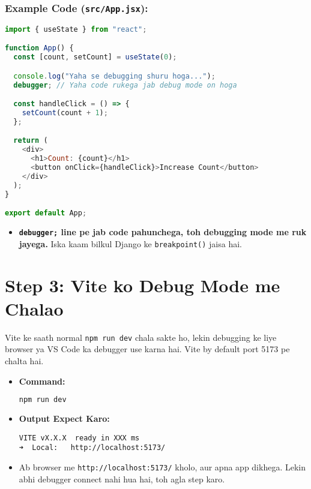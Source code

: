 \documentclass[a4paper,12pt]{article}
\begin{document}
\subsubsection{Example Code (\texttt{\color{mygreen}src/App.jsx}):}
\begin{lstlisting}[language=JavaScript]
import { useState } from "react";

function App() {
  const [count, setCount] = useState(0);

  console.log("Yaha se debugging shuru hoga...");
  debugger; // Yaha code rukega jab debug mode on hoga

  const handleClick = () => {
    setCount(count + 1);
  };

  return (
    <div>
      <h1>Count: {count}</h1>
      <button onClick={handleClick}>Increase Count</button>
    </div>
  );
}

export default App;
\end{lstlisting}
\begin{itemize}
    \item \textbf{\color{myblue}\texttt{\color{mygreen}debugger;} line pe jab code pahunchega, toh debugging mode me ruk jayega.} Iska kaam bilkul Django ke \texttt{\color{mygreen}breakpoint()} jaisa hai.
\end{itemize}

\section{ Step 3: Vite ko Debug Mode me Chalao}
Vite ke saath normal \texttt{\color{mygreen}npm run dev} chala sakte ho, lekin debugging ke liye browser ya VS Code ka debugger use karna hai. Vite by default port 5173 pe chalta hai.

\begin{itemize}
    \item \textbf{\color{myblue}Command:}  
    \begin{lstlisting}[language=Bash]
npm run dev
    \end{lstlisting}
    \item \textbf{\color{myblue}Output Expect Karo:}  
    \begin{verbatim}
VITE vX.X.X  ready in XXX ms
➜  Local:   http://localhost:5173/
    \end{verbatim}
    \item Ab browser me \texttt{\color{mygreen}http://localhost:5173/} kholo, aur apna app dikhega. Lekin abhi debugger connect nahi hua hai, toh agla step karo.
\end{itemize}
\end{document}

